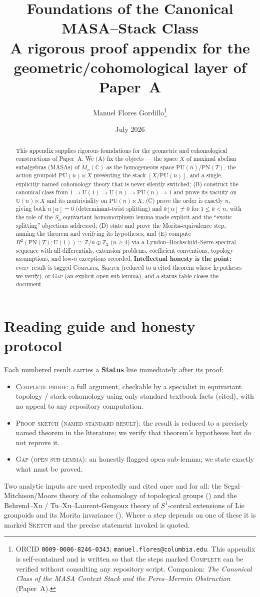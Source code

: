 \documentclass[11pt]{article}
\title{Foundations of the Canonical MASA--Stack Class\\
\large A rigorous proof appendix for the geometric/cohomological layer of Paper~A}
\author{Manuel Flores Gordillo\thanks{ORCID \texttt{0009-0006-8246-0343};
\texttt{manuel.flores@columbia.edu}. This appendix is self-contained and is written so
that the steps marked \textsc{Complete} can be verified without consulting any repository
script. Companion: \emph{The Canonical Class of the MASA Context Stack and the
Peres--Mermin Obstruction} (Paper~A).}}
\date{July 2026}
\theoremstyle{definition}
\newcommand{\U}{\mathrm{U}}
\newcommand{\PU}{\mathrm{PU}}
\newcommand{\PN}{\mathrm{PN}}
\newcommand{\Z}{\mathbb{Z}}
\newcommand{\C}{\mathbb{C}}
\newcommand{\COMPLETE}{\textsc{Complete proof}}
\newcommand{\SKETCH}{\textsc{Proof sketch (named standard result)}}
\newcommand{\GAP}{\textsc{Gap (open sub-lemma)}}
\begin{document}
\maketitle

\begin{abstract}
This appendix supplies rigorous foundations for the geometric and cohomological
constructions of Paper~A. We (A) fix the objects --- the space $X$ of maximal abelian
subalgebras (MASAs) of $M_n(\C)$ as the homogeneous space $\PU(n)/\PN(T)$, the action
groupoid $\PU(n)\ltimes X$ presenting the stack $[X/\PU(n)]$, and a single, explicitly
named cohomology theory that is never silently switched; (B) construct the canonical class
from $1\to\U(1)\to\U(n)\to\PU(n)\to1$ and prove its vacuity on $\U(n)\ltimes X$ and its
nontriviality on $\PU(n)\ltimes X$; (C) prove the order is exactly $n$, giving both
$n[\alpha]=0$ (determinant-twist splitting) and $k[\alpha]\neq0$ for $1\le k<n$, with the
role of the $S_n$-equivariant homomorphism lemma made explicit and the ``exotic splitting''
objections addressed; (D) state and prove the Morita-equivalence step, naming the theorem
and verifying its hypotheses; and (E) compute $H^2(\PN(T);\U(1))\cong \Z/n\oplus\Z_2$
($n\ge4$) via a Lyndon--Hochschild--Serre spectral sequence with all differentials,
extension problems, coefficient conventions, topology assumptions, and low-$n$ exceptions
recorded. \textbf{Intellectual honesty is the point:} every result is tagged
\textsc{Complete}, \textsc{Sketch} (reduced to a cited theorem whose hypotheses we verify),
or \textsc{Gap} (an explicit open sub-lemma), and a status table closes the document.
\end{abstract}

\tableofcontents

\section*{Reading guide and honesty protocol}
Each numbered result carries a \textbf{Status} line immediately after its proof:
\begin{itemize}
\item \COMPLETE{}: a full argument, checkable by a specialist in equivariant topology /
stack cohomology using only standard textbook facts (cited), with no appeal to any
repository computation.
\item \SKETCH{}: the result is reduced to a precisely named theorem in the literature; we
verify that theorem's hypotheses but do not reprove it.
\item \GAP{}: an honestly flagged open sub-lemma; we state exactly what must be proved.
\end{itemize}
Two analytic inputs are used repeatedly and cited once and for all: the
Segal--Mitchison/Moore theory of the cohomology of topological groups
(\cite{Segal,MooreIII,MooreIV,Wigner}) and the Behrend--Xu / Tu--Xu--Laurent-Gengoux theory
of $S^1$-central extensions of Lie groupoids and its Morita invariance
(\cite{BehrendXu,TXL,Crainic}). Where a step depends on one of these it is marked
\textsc{Sketch} and the precise statement invoked is quoted.
\end{document}
